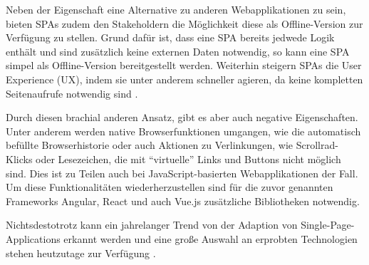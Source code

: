 Neben der Eigenschaft eine Alternative zu anderen Webapplikationen zu sein, bieten SPAs zudem den Stakeholdern die Möglichkeit diese als Offline-Version zur Verfügung zu stellen. Grund dafür ist, dass eine SPA bereits jedwede Logik enthält und sind zusätzlich keine externen Daten notwendig, so kann eine SPA simpel als Offline-Version bereitgestellt werden. Weiterhin steigern SPAs die User Experience (UX), indem sie unter anderem schneller agieren, da keine kompletten Seitenaufrufe notwendig sind \cite{ImprovementOfAcedemicServiceBasedOnSPA}.

Durch diesen brachial anderen Ansatz, gibt es aber auch negative Eigenschaften. Unter anderem werden native Browserfunktionen umgangen, wie die automatisch befüllte Browserhistorie oder auch Aktionen zu Verlinkungen, wie Scrollrad-Klicks oder Lesezeichen, die mit \enquote{virtuelle} Links und Buttons nicht möglich sind. Dies ist zu Teilen auch bei JavaScript-basierten Webapplikationen der Fall. Um diese Funktionalitäten wiederherzustellen sind für die zuvor genannten Frameworks Angular, React und auch Vue.js zusätzliche Bibliotheken notwendig.

Nichtsdestotrotz kann ein jahrelanger Trend von der Adaption von Single-Page-Applications erkannt werden und eine große Auswahl an erprobten Technologien stehen heutzutage zur Verfügung \cite{TheStateOfJavaScript2020}.

